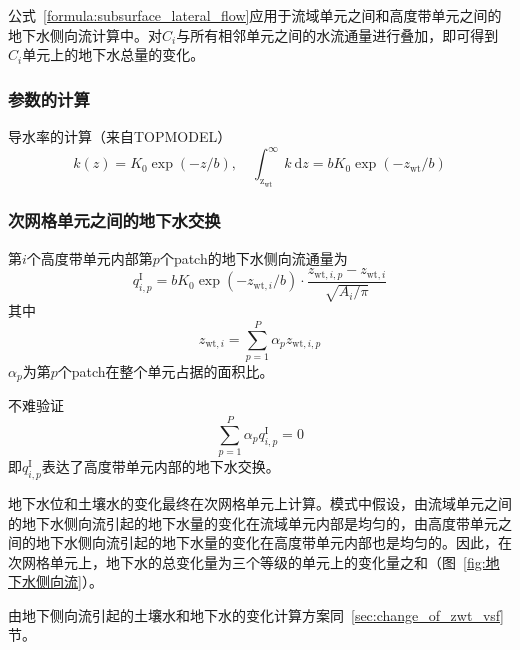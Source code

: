 公式~\eqref{formula:subsurface_lateral_flow}应用于流域单元之间和高度带单元之间的地下水侧向流计算中。对$C_i$与所有相邻单元之间的水流通量进行叠加，即可得到$C_i$单元上的地下水总量的变化。

\subsubsection{参数的计算}
导水率的计算（来自TOPMODEL）
    \begin{equation}
      k(z) = K_0\exp{(- z/b)},\quad \int^\infty_{\mathrm{z_{wt}}} k\ \mathrm{d}z = b K_0\exp{(-z_{\mathrm{wt}}/b)}
    \end{equation}

\subsubsection{次网格单元之间的地下水交换}
第$i$个高度带单元内部第$p$个patch的地下水侧向流通量为
\begin{equation}
  q^{\mathrm{I}}_{i,p} = b K_0 \exp{(-z_{\mathrm{wt},i}/b)}\cdot\frac{z_{\mathrm{wt},i,p}-z_{\mathrm{wt},i}}{\sqrt{A_i/\pi}}
\end{equation}
其中
$$z_{\mathrm{wt},i} = \sum^P_{p=1} \alpha_{p}  z_{\mathrm{wt},i,p}$$
$\alpha_{p} $为第$p$个patch在整个单元占据的面积比。

不难验证
$$\sum^P_{p=1} \alpha_{p}  q^{\mathrm{I}}_{i,p} =0$$
即$q^{\mathrm{I}}_{i,p}$表达了高度带单元内部的地下水交换。

地下水位和土壤水的变化最终在次网格单元上计算。模式中假设，由流域单元之间的地下水侧向流引起的地下水量的变化在流域单元内部是均匀的，由高度带单元之间的地下水侧向流引起的地下水量的变化在高度带单元内部也是均匀的。因此，在次网格单元上，地下水的总变化量为三个等级的单元上的变化量之和（图~\ref{fig:地下水侧向流}）。

由地下侧向流引起的土壤水和地下水的变化计算方案同~\ref{sec:change_of_zwt_vsf}节。



